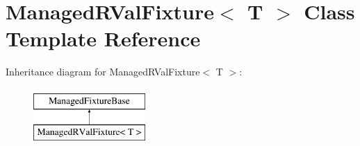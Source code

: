 \hypertarget{class_managed_r_val_fixture}{\section{Managed\-R\-Val\-Fixture$<$ T $>$ Class Template Reference}
\label{class_managed_r_val_fixture}
}
Inheritance diagram for Managed\-R\-Val\-Fixture$<$ T $>$\-:\begin{figure}[H]
\begin{center}
\leavevmode
\includegraphics[height=2.000000cm]{class_managed_r_val_fixture}
\end{center}
\end{figure}
